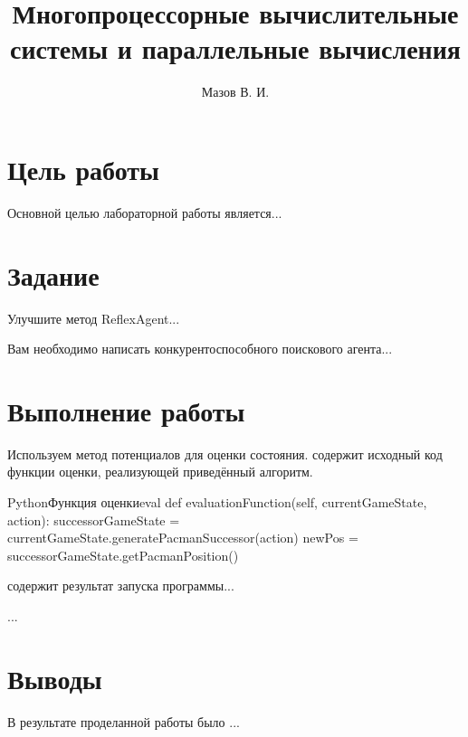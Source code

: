 \documentclass{lab_report}
\begin{document}
\title{Многопроцессорные вычислительные системы и параллельные вычисления}
\author{Мазов В. И.}

\maketitle

\tableofcontents

\section{Цель работы}
Основной целью лабораторной работы является...


\section{Задание}
\begin{task}
	Улучшите метод ReflexAgent...
\end{task}

\begin{task}
	Вам необходимо написать конкурентоспособного поискового агента...
\end{task}

\section{Выполнение работы}

\taskDoneSection
Используем метод потенциалов для оценки состояния.  содержит исходный код функции оценки, реализующей приведённый алгоритм.

\begin{listing}{Python}{Функция оценки}{eval}
def evaluationFunction(self, currentGameState, action): 
	successorGameState = currentGameState.generatePacmanSuccessor(action)
	newPos = successorGameState.getPacmanPosition()
\end{listing}


 содержит результат запуска программы...


\taskDoneSection
...

\section{Выводы}
В результате проделанной работы было ...
\end{document}

